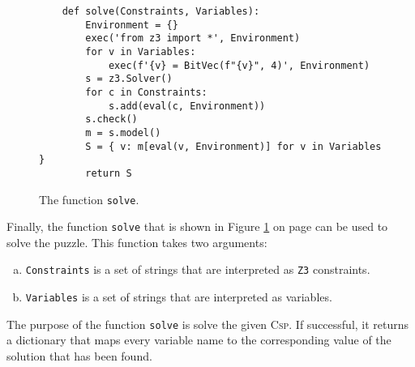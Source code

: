 \begin{figure}[!ht]
\centering
\begin{verbatim}
    def solve(Constraints, Variables):
        Environment = {}
        exec('from z3 import *', Environment)
        for v in Variables:
            exec(f'{v} = BitVec(f"{v}", 4)', Environment)
        s = z3.Solver()
        for c in Constraints:
            s.add(eval(c, Environment))
        s.check()
        m = s.model()
        S = { v: m[eval(v, Environment)] for v in Variables }
        return S
\end{verbatim}
\vspace*{-0.3cm}
\caption{The function \texttt{solve}.}
\label{fig:Knight's Tour with Z3.ipynb-2}
\end{figure}
Finally, the function \texttt{solve} that is shown in Figure \ref{fig:Knight's Tour with Z3.ipynb-2} on page
\pageref{fig:Knight's Tour with Z3.ipynb-2} can be used to solve the puzzle.  This function takes two
arguments:
\begin{enumerate}[(a)]
\item \texttt{Constraints} is a set of strings that are interpreted as \texttt{Z3} constraints.
\item \texttt{Variables} is a set of strings that are interpreted as variables.
\end{enumerate}
The purpose of the function \texttt{solve} is solve the given \textsc{Csp}.
If successful, it returns a dictionary that maps every variable name to the corresponding value of the solution
that has been found.
